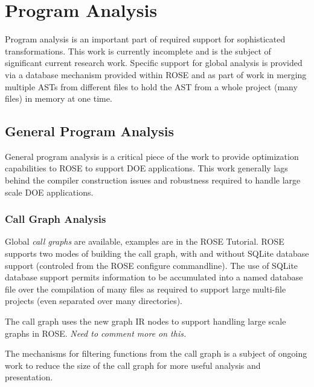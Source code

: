 \chapter{Program Analysis}

\label{ProgramAnalysis}


Program analysis is an important part of required support for sophisticated 
transformations. This work is currently incomplete and is
the subject of significant current research work.  Specific support for global analysis 
is provided via a database mechanism provided within ROSE and as part of work
in merging multiple ASTs from different files to hold the AST from a whole project
(many files) in memory at one time.


\section{General Program Analysis}

   General program analysis is a critical piece of the work to
provide optimization capabilities to ROSE to support DOE applications.
This work generally lags behind the compiler construction issues
and robustness required to handle large scale DOE applications.

\subsection{Call Graph Analysis}

   Global {\it call graphs} are available, examples are in the ROSE Tutorial.
ROSE supports two modes of building the call graph, with and without SQLite 
database support (controled from the ROSE configure commandline). The use of SQLite
database support permits information to be accumulated into a named database file
over the compilation of many files as required to support large multi-file projects
(even separated over many directories).

   The call graph uses the new graph IR nodes to support handling large scale 
graphs in ROSE. {\em Need to comment more on this.}

   The mechanisms for filtering functions from the call graph is a subject
of ongoing work to reduce the size of the call graph for more useful analysis
and presentation.

